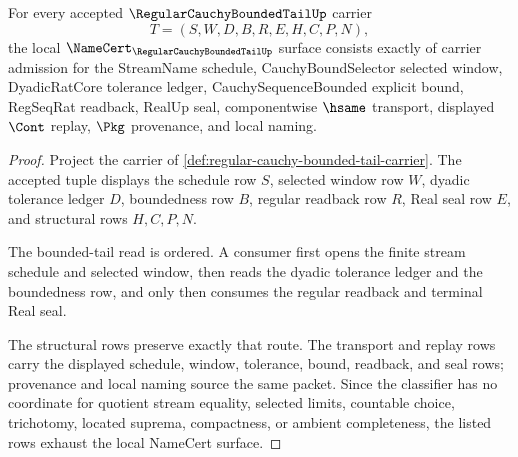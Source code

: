 \begin{theorem}
\label{thm:regular-cauchy-bounded-tail-namecert-obligations}
For every accepted $\RegularCauchyBoundedTailUp$ carrier
$$
T=(S,W,D,B,R,E,H,C,P,N),
$$
the local $\NameCert_{\RegularCauchyBoundedTailUp}$ surface consists exactly of carrier admission for the StreamName schedule, CauchyBoundSelector selected window, DyadicRatCore tolerance ledger, CauchySequenceBounded explicit bound, RegSeqRat readback, RealUp seal, componentwise $\hsame$ transport, displayed $\Cont$ replay, $\Pkg$ provenance, and local naming.
\end{theorem}
\begin{proof}
Project the carrier of \autoref{def:regular-cauchy-bounded-tail-carrier}. The accepted tuple displays the schedule row $S$, selected window row $W$, dyadic tolerance ledger $D$, boundedness row $B$, regular readback row $R$, Real seal row $E$, and structural rows $H,C,P,N$.

The bounded-tail read is ordered. A consumer first opens the finite stream schedule and selected window, then reads the dyadic tolerance ledger and the boundedness row, and only then consumes the regular readback and terminal Real seal.

The structural rows preserve exactly that route. The transport and replay rows carry the displayed schedule, window, tolerance, bound, readback, and seal rows; provenance and local naming source the same packet. Since the classifier has no coordinate for quotient stream equality, selected limits, countable choice, trichotomy, located suprema, compactness, or ambient completeness, the listed rows exhaust the local NameCert surface.
\end{proof}

